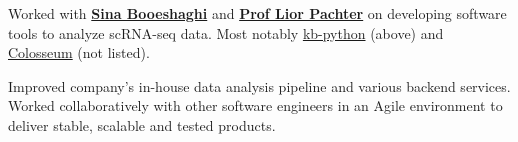 \documentclass[]{resume}
\begin{document}
\begin{minipage}[t]{0.69\textwidth}
Worked with \textbf{\href{https://sinabooeshaghi.com/}{Sina Booeshaghi}} and \textbf{\href{https://pachterlab.github.io/biography.html}{Prof Lior Pachter}} on developing software tools to analyze scRNA-seq data. Most notably \href{https://github.com/pachterlab/kb_python}{kb-python} (above) and \href{https://github.com/pachterlab/colosseum}{Colosseum} (not listed).
\sectionsep

Improved company's in-house data analysis pipeline and various backend services. Worked collaboratively with other software engineers in an Agile environment to deliver stable, scalable and tested products.
\sectionsep







\end{minipage}
\end{document}
